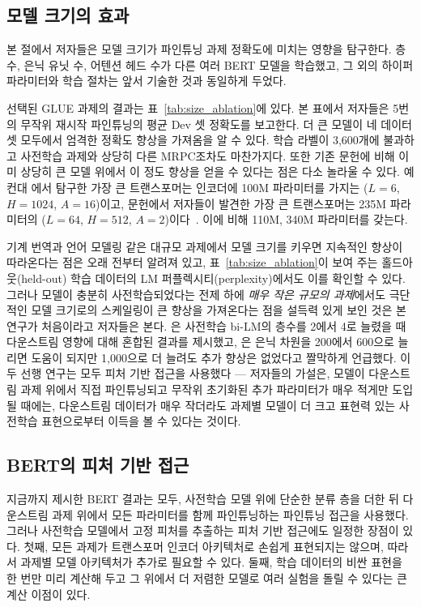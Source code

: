 \subsection{모델 크기의 효과}
\label{sec:model_size_ablation}

본 절에서 저자들은 모델 크기가 파인튜닝 과제 정확도에 미치는 영향을 탐구한다. 층수, 은닉 유닛 수, 어텐션 헤드 수가 다른 여러 BERT 모델을 학습했고, 그 외의 하이퍼파라미터와 학습 절차는 앞서 기술한 것과 동일하게 두었다.

선택된 GLUE 과제의 결과는 표~\ref{tab:size_ablation}에 있다. 본 표에서 저자들은 5번의 무작위 재시작 파인튜닝의 평균 Dev 셋 정확도를 보고한다. 더 큰 모델이 네 데이터셋 모두에서 엄격한 정확도 향상을 가져옴을 알 수 있다. 학습 라벨이 3,600개에 불과하고 사전학습 과제와 상당히 다른 MRPC조차도 마찬가지다. 또한 기존 문헌에 비해 이미 상당히 큰 모델 위에서 이 정도 향상을 얻을 수 있다는 점은 다소 놀라울 수 있다. 예컨대 \citet{vaswani-etal:2017:_atten}에서 탐구한 가장 큰 트랜스포머는 인코더에 100M 파라미터를 가지는 ($L=6$, $H=1024$, $A=16$)이고, 문헌에서 저자들이 발견한 가장 큰 트랜스포머는 235M 파라미터의 ($L=64$, $H=512$, $A=2$)이다~\cite{alrfou:2018}. 이에 비해  110M,  340M 파라미터를 갖는다.



기계 번역과 언어 모델링 같은 대규모 과제에서 모델 크기를 키우면 지속적인 향상이 따라온다는 점은 오래 전부터 알려져 있고, 표~\ref{tab:size_ablation}이 보여 주는 홀드아웃(held-out) 학습 데이터의 LM 퍼플렉시티(perplexity)에서도 이를 확인할 수 있다. 그러나 모델이 충분히 사전학습되었다는 전제 하에 \emph{매우 작은 규모의 과제}에서도 극단적인 모델 크기로의 스케일링이 큰 향상을 가져온다는 점을 설득력 있게 보인 것은 본 연구가 처음이라고 저자들은 본다. \citet{peters2018dissecting}은 사전학습 bi-LM의 층수를 2에서 4로 늘렸을 때 다운스트림 영향에 대해 혼합된 결과를 제시했고, \citet{melamud2016context2vec}은 은닉 차원을 200에서 600으로 늘리면 도움이 되지만 1,000으로 더 늘려도 추가 향상은 없었다고 짤막하게 언급했다. 이 두 선행 연구는 모두 피처 기반 접근을 사용했다 --- 저자들의 가설은, 모델이 다운스트림 과제 위에서 직접 파인튜닝되고 무작위 초기화된 추가 파라미터가 매우 적게만 도입될 때에는, 다운스트림 데이터가 매우 작더라도 과제별 모델이 더 크고 표현력 있는 사전학습 표현으로부터 이득을 볼 수 있다는 것이다.



\subsection{BERT의 피처 기반 접근}
\label{sec:ner}
지금까지 제시한 BERT 결과는 모두, 사전학습 모델 위에 단순한 분류 층을 더한 뒤 다운스트림 과제 위에서 모든 파라미터를 함께 파인튜닝하는 파인튜닝 접근을 사용했다. 그러나 사전학습 모델에서 고정 피처를 추출하는 피처 기반 접근에도 일정한 장점이 있다. 첫째, 모든
과제가 트랜스포머 인코더 아키텍처로 손쉽게 표현되지는 않으며, 따라서 과제별 모델 아키텍처가 추가로 필요할 수 있다. 둘째, 학습 데이터의 비싼 표현을 한 번만 미리 계산해 두고 그 위에서 더 저렴한
모델로 여러 실험을 돌릴 수 있다는 큰 계산 이점이 있다.


